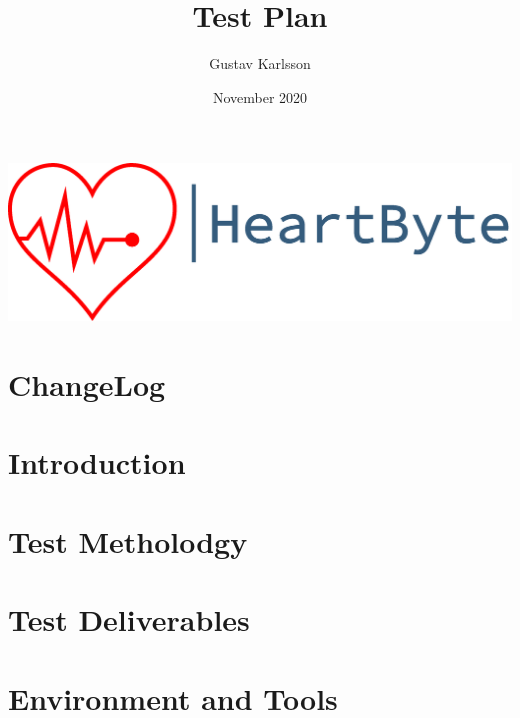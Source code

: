 \documentclass[12pt]{article}
\title{\Huge Test Plan}
\author{Gustav Karlsson }
\date{November 2020}
\begin{document}
\maketitle
\vfill
\includegraphics[width=\linewidth]{Pictures/logo_heartbyte_transparent_v_1_1 (1)}

    \vfill
\clearpage


\section*{ChangeLog}



\clearpage
\tableofcontents
\clearpage
\section{Introduction}


\section{Test Metholodgy}


\section{Test Deliverables}

\section{Environment and Tools}




\end{document}
